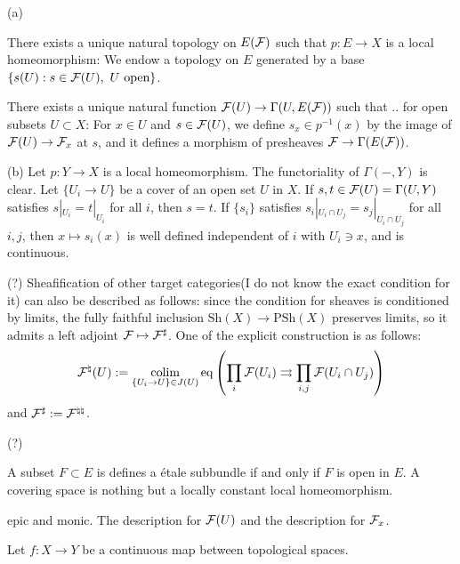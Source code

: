 \documentclass{../../large}
\newcommand{\PSh}{\mathrm{PSh}}
\newcommand{\Sh}{\mathrm{Sh}}
\begin{document}
\begin{pf}
(a)

There exists a unique natural topology on $E(\mathcal{F})$ such that $p:E\to X$ is a local homeomorphism:
We endow a topology on $E$ generated by a base $\{s(U):s\in\cF(U),\ U\text{ open}\}$.

There exists a unique natural function $\mathcal{F}(U)\to\Gamma(U,E(\mathcal{F}))$ such that .. for open subsets $U\subset X$:
For $x\in U$ and $s\in\mathcal{F}(U)$, we define $s_x\in p^{-1}(x)$ by the image of $\mathcal{F}(U)\to\mathcal{F}_x$ at $s$, and it defines a morphism of presheaves $\mathcal{F}\to\Gamma(E(\mathcal{F}))$.

(b)
Let $p:Y\to X$ is a local homeomorphism.
The functoriality of $\Gamma(-,Y)$ is clear.
Let $\{U_i\to U\}$ be a cover of an open set $U$ in $X$.
If $s,t\in\mathcal{F}(U)=\Gamma(U,Y)$ satisfies $s|_{U_i}=t|_{U_i}$ for all $i$, then $s=t$.
If $\{s_i\}$ satisfies $s_i|_{U_i\cap U_j}=s_j|_{U_i\cap U_j}$ for all $i,j$, then $x\mapsto s_i(x)$ is well defined independent of $i$ with $U_i\ni x$, and is continuous.


(?)
Sheafification of other target categories(I do not know the exact condition for it) can also be described as follows:
since the condition for sheaves is conditioned by limits, the fully faithful inclusion $\Sh(X)\to\PSh(X)$ preserves limits, so it admits a left adjoint $\mathcal{F}\mapsto\mathcal{F}^\sharp$.
One of the explicit construction is as follows:
\[\mathcal{F}^\natural(U):=\operatorname*{colim}_{\{U_i\to U\}\in J(U)}\mathrm{eq}\left(\prod_i\mathcal{F}(U_i)\rightrightarrows\prod_{i,j}\mathcal{F}(U_i\cap U_j)\right)\]
and $\mathcal{F}^\sharp:=\mathcal{F}^{\natural\natural}$.



(?)

A subset $F\subset E$ is defines a \'etale subbundle if and only if $F$ is open in $E$.
A covering space is nothing but a locally constant local homeomorphism.


\end{pf}

\begin{prb}
epic and monic.
The description for $\mathcal{F}(U)$ and the description for $\mathcal{F}_x$.

Let $f:X\to Y$ be a continuous map between topological spaces.
\end{prb}
\end{document}
